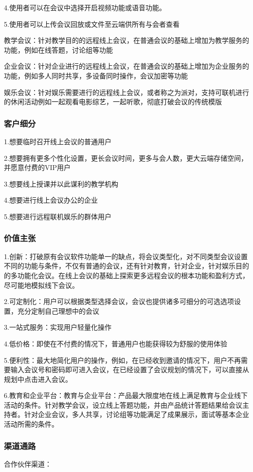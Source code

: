 \documentclass[a4paper,12pt]{article}
\begin{document}
4.使用者可以在会议中选择开启视频功能或语音功能。

5.使用者可以上传会议回放或文件至云端供所有与会者查看

\noindent 教学会议：针对教学目的的远程线上会议，在普通会议的基础上增加为教学服务的功能，例如在线答题，讨论组等功能

\noindent 企业会议：针对企业进行的远程线上会议，在普通会议的基础上增加为企业服务的功能，例如多人同时共享，多设备同时操作，会议加密等功能

\noindent 娱乐会议：针对娱乐需要进行的远程线上会议，或者称之为派对，支持可联机进行的休闲活动例如一起观看电影综艺，一起听歌，彻底打破会议的传统模版
    
\subsubsection{客户细分}
1.想要临时召开线上会议的普通用户

2.想要拥有更多个性化设置，更长会议时间，更多与会人数，更大云端存储空间，并愿意付费的VIP用户

3.想要线上授课并以此谋利的教学机构

4.想要进行线上会议办公的企业

5.想要进行远程联机娱乐的群体用户
\subsubsection{价值主张}
1.创新：打破原有会议软件功能单一的缺点，将会议类型化，对不同类型会议设置不同的功能与条件，不仅有普通的会议，还有针对教育，针对企业，针对娱乐目的的多功能化会议。在线上会议的基础上探索更多远程会议的根本功能和盈利方式，尽可能地模拟线下会议。

2.可定制化：用户可以根据类型选择会议，会议也提供诸多可细分的可选选项设置，充分定制自己理想中的会议

3.一站式服务：实现用户轻量化操作

4.低价格：即使在不付费的情况下，普通用户也能获得较为舒服的使用体验

5.便利性：最大地简化用户的操作，例如，在已经收到邀请的情况下，用户不再需要输入会议号和密码即可进入会议，在已经设置了会议规划的情况下，可以直接从规划中点击进入会议。

6.教育和企业平台：教育与企业平台：产品最大限度地在线上满足教育与企业线下活动的条件。针对教学会议，设立线上答题功能，并由产品统计答题结果给会议主持者。针对企业会议，多人共享，讨论组等功能满足了成果展示，面试等基本企业活动所需的条件。
\subsubsection{渠道通路}
合作伙伴渠道：
\end{document}
